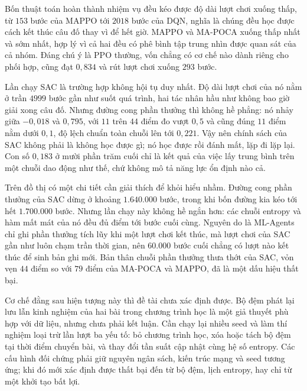 \indent Bốn thuật toán hoàn thành nhiệm vụ đều kéo được độ dài lượt chơi xuống thấp, từ $153$ bước của
MAPPO tới $2018$ bước của DQN, nghĩa là chúng đều học được cách kết thúc câu đố thay vì để hết
giờ. MAPPO và MA-POCA xuống thấp nhất và sớm
nhất, hợp lý vì cả hai đều có phê bình tập trung nhìn được quan sát của cả nhóm. Đáng chú
ý là PPO thường, vốn chẳng có cơ chế nào dành riêng cho phối hợp, cũng đạt $0{,}834$ và
rút lượt chơi xuống $293$ bước.

\indent Lần chạy SAC là trường hợp không hội tụ duy nhất. Độ
dài lượt chơi của nó nằm ở trần $4999$ bước gần như suốt
quá trình, hai tác nhân hầu như không bao giờ giải xong câu đố. Nhưng đường cong phần
thưởng thì không hề phẳng: nó nhảy giữa $-0{,}018$ và $0{,}795$, với $11$ trên $44$ điểm đo
vượt $0{,}5$ và cũng đúng $11$ điểm nằm dưới $0{,}1$, độ lệch
chuẩn toàn chuỗi lên tới $0{,}221$. Vậy nên chính sách của SAC không phải là không học
được gì; nó học được rồi đánh mất, lặp đi lặp lại. Con số $0{,}183$ ở mười phần trăm cuối
chỉ là kết quả của việc lấy trung bình trên một chuỗi dao động như thế, chứ không mô tả
năng lực ổn định nào cả.

\indent Trên đồ thị có một chi tiết cần giải thích để khỏi hiểu nhầm. Đường cong phần
thưởng của SAC dừng ở khoảng $1.640.000$ bước, trong khi bốn đường kia kéo tới hết $1.700.000$
bước. Nhưng lần chạy này không hề ngắn hơn: các
chuỗi entropy và hàm mất mát của nó đều đủ điểm tới bước cuối cùng. Nguyên do là ML-Agents
chỉ ghi phần thưởng tích lũy khi một lượt chơi kết thúc, mà lượt chơi của SAC gần như luôn
chạm trần thời gian, nên $60.000$ bước cuối chẳng có lượt nào kết thúc để sinh bản
ghi mới. Bản thân chuỗi phần thưởng thưa thớt của SAC, vỏn vẹn $44$ điểm so với $79$ điểm của
MA-POCA và MAPPO, đã là một dấu hiệu thất bại.

\indent Cơ chế đằng sau hiện tượng này thì đề tài chưa xác định được. Bộ đệm phát lại lưu
lẫn kinh nghiệm của hai bài trong chương trình học là một giả thuyết phù hợp với dữ liệu,
nhưng chưa phải kết luận. Cần chạy lại nhiều seed và làm thí nghiệm loại trừ lần lượt ba
yếu tố: bỏ chương trình học, xóa hoặc tách bộ đệm tại thời điểm chuyển bài, và thay đổi
tần suất cập nhật cùng hệ số entropy. Các cấu hình đối chứng phải giữ nguyên ngân sách,
kiến trúc mạng và seed tương ứng; khi đó mới xác định được thất bại đến từ bộ đệm, lịch
entropy, hay chỉ từ một khởi tạo bất lợi.

